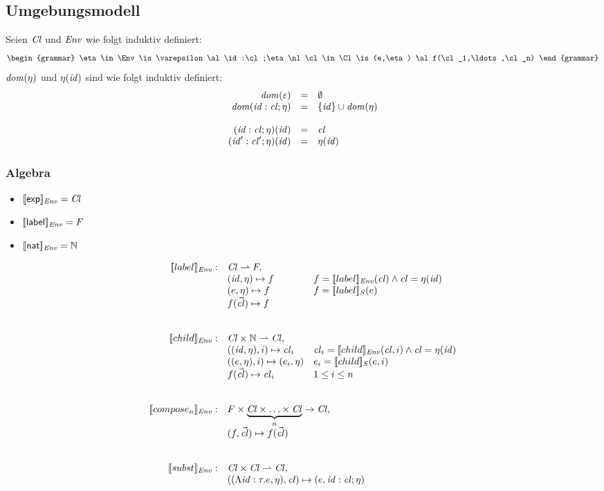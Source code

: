 \documentclass[%
  12pt,%
  a4paper,%
]{article}
\begin{document}
\subsection*{Umgebungsmodell}

Seien $\mathit{Cl}$ und $\mathit{Env}$ wie folgt induktiv definiert:
\[\begin{grammar}
  \eta \in \Env
  \is \varepsilon
  \al \id:\cl;\eta
  \nl
  \cl \in \Cl
  \is (e,\eta)
  \al f(\cl_1,\ldots,\cl_n)
\end{grammar}\]
$\mathit{dom}(\eta)$ und $\eta(\mathit{id})$ sind wie folgt induktiv definiert:
\[\begin{array}{rcl}
  \mathit{dom}(\varepsilon) &=& \emptyset \\
  \mathit{dom}(\mathit{id}:\mathit{cl};\eta) &=& \{\mathit{id}\} \cup \mathit{dom}(\eta) \\
  \\
  (\mathit{id}:\mathit{cl};\eta)(\mathit{id}) &=& \mathit{cl} \\
  (\mathit{id}':\mathit{cl}';\eta)(\mathit{id}) &=& \eta(\mathit{id}) \\
\end{array}\]

\subsubsection*{Algebra}

\begin{itemize}
\item $[\![\mathsf{exp}]\!]_{\mathit{Env}} = \mathit{Cl}$
\item $[\![\mathsf{label}]\!]_{\mathit{Env}} = F$
\item $[\![\mathsf{nat}]\!]_{\mathit{Env}} = \mathbb N$
\end{itemize}

\[\begin{array}{rll}
  \sem{label}_\Env: & \Cl \pto F, \\
  & (\id,\eta) \mapsto f & f = \sem{label}_\Env(\cl) \wedge \cl = \eta(\id) \\
  & (e,\eta) \mapsto f & f = \sem{label}_S(e) \\
  & f(\vec{\cl}) \mapsto f \\
  \\\\
  \sem{child}_\Env: & \Cl \times \N \pto \Cl, \\
  & ((\id,\eta),i) \mapsto \cl_i & \cl_i = \sem{child}_\Env(\cl, i) \wedge \cl = \eta(\id) \\
  & ((e,\eta),i) \mapsto (e_i,\eta) & e_i = \sem{child}_S(e,i) \\
  & f(\vec{\cl}) \mapsto \cl_i & 1 \le i \le n \\
  \\\\
  \sem{compose_n}_\Env: & \multicolumn{2}{l}{F \times \underbrace{\Cl \times \ldots \times \Cl}_n \to \Cl,} \\
  & \multicolumn{2}{l}{(f,\vec{\cl}) \mapsto f(\vec{\cl})} \\
  \\\\
  \sem{subst}_\Env: & \multicolumn{2}{l}{\Cl \times \Cl \pto \Cl,} \\
  & \multicolumn{2}{l}{((\Lambda\id:\tau.e,\eta),\cl) \mapsto (e,\id:\cl;\eta)}
\end{array}\]
\end{document}
